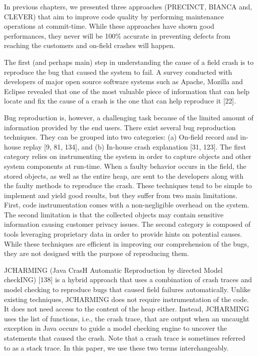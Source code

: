 \documentclass[12pt]{report}
\begin{document}
In previous chapters, we presented three approaches (PRECINCT, BIANCA
and, CLEVER) that aim to improve code quality by performing maintenance
operations at commit-time. While these approaches have shown good
performances, they never will be 100\% accurate in preventing defects
from reaching the customers and on-field crashes will happen.

The first (and perhaps main) step in understanding the cause of a field
crash is to reproduce the bug that caused the system to fail. A survey
conducted with developers of major open source software systems such as
Apache, Mozilla and Eclipse revealed that one of the most valuable piece
of information that can help locate and fix the cause of a crash is the
one that can help reproduce it {[}22{]}.

Bug reproduction is, however, a challenging task because of the limited
amount of information provided by the end users. There exist several bug
reproduction techniques. They can be grouped into two categories: (a)
On-field record and in-house replay {[}9, 81, 134{]}, and (b) In-house
crash explanation {[}31, 123{]}. The first category relies on
instrumenting the system in order to capture objects and other system
components at run-time. When a faulty behavior occurs in the field, the
stored objects, as well as the entire heap, are sent to the developers
along with the faulty methods to reproduce the crash. These techniques
tend to be simple to implement and yield good results, but they suffer
from two main limitations. First, code instrumentation comes with a
non-negligible overhead on the system. The second limitation is that the
collected objects may contain sensitive information causing customer
privacy issues. The second category is composed of tools leveraging
proprietary data in order to provide hints on potential causes. While
these techniques are efficient in improving our comprehension of the
bugs, they are not designed with the purpose of reproducing them.

JCHARMING (Java CrasH Automatic Reproduction by directed Model checkING)
{[}138{]} is a hybrid approach that uses a combination of crash traces
and model checking to reproduce bugs that caused field failures
automatically. Unlike existing techniques, JCHARMING does not require
instrumentation of the code. It does not need access to the content of
the heap either. Instead, JCHARMING uses the list of functions, i.e.,
the crash trace, that are output when an uncaught exception in Java
occurs to guide a model checking engine to uncover the statements that
caused the crash. Note that a crash trace is sometimes referred to as a
stack trace. In this paper, we use these two terms interchangeably.
\end{document}
